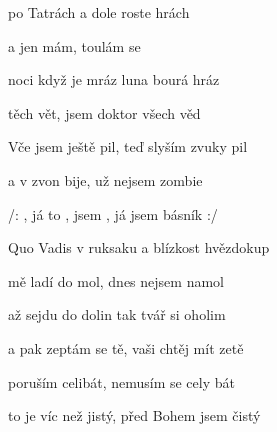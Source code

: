 

   

\zs
{} po Tatrách a dole roste hrách

a  jen mám, toulám se 

 noci když je mráz luna bourá hráz

těch  vět, jsem doktor všech věd

Vče jsem ještě pil, teď slyším zvuky pil

a v  zvon bije, už nejsem zombie
\ks

\zr
/: , já to ,
jsem , já jsem básník :/
\kr

   

\zs
Quo Vadis v ruksaku a blízkost hvězdokup

mě ladí do mol, dnes nejsem namol

až sejdu do dolin tak tvář si oholim

a pak zeptám se tě, vaši chtěj mít zetě

poruším celibát, nemusím se cely bát

to je víc než jistý, před Bohem jsem čistý
\ks

\zr   \kr  \zr  \kr  \zr  \kr

\kp





